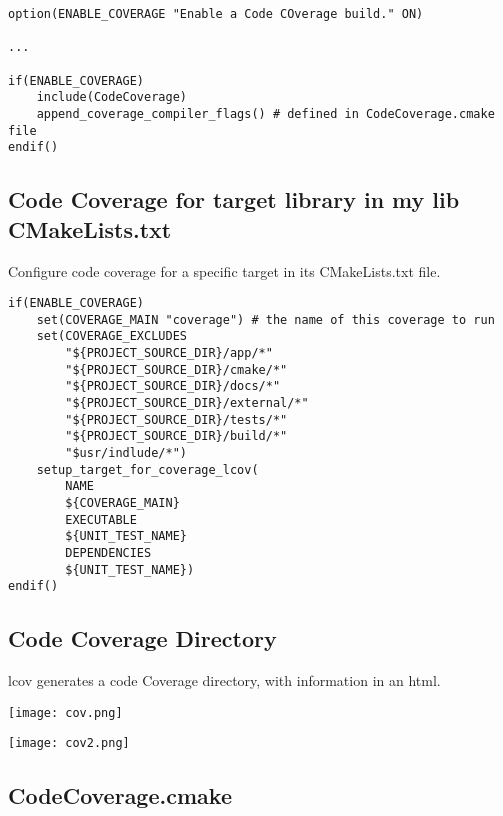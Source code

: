 \documentclass[openany]{report}
\begin{document}
\begin{verbatim}
option(ENABLE_COVERAGE "Enable a Code COverage build." ON)

...

if(ENABLE_COVERAGE)
    include(CodeCoverage)
    append_coverage_compiler_flags() # defined in CodeCoverage.cmake file
endif()

\end{verbatim}

\subsection{Code Coverage for target library in my lib CMakeLists.txt}

Configure code coverage for a specific target in its CMakeLists.txt file.

\begin{verbatim}
if(ENABLE_COVERAGE)
    set(COVERAGE_MAIN "coverage") # the name of this coverage to run
    set(COVERAGE_EXCLUDES
        "${PROJECT_SOURCE_DIR}/app/*"
        "${PROJECT_SOURCE_DIR}/cmake/*"
        "${PROJECT_SOURCE_DIR}/docs/*"
        "${PROJECT_SOURCE_DIR}/external/*"
        "${PROJECT_SOURCE_DIR}/tests/*"
        "${PROJECT_SOURCE_DIR}/build/*"
        "$usr/indlude/*")
    setup_target_for_coverage_lcov(
        NAME
        ${COVERAGE_MAIN}
        EXECUTABLE
        ${UNIT_TEST_NAME}
        DEPENDENCIES
        ${UNIT_TEST_NAME})
endif()
\end{verbatim}


\subsection{Code Coverage Directory}

lcov generates a code Coverage directory, with information in an html.


\begin{center}
    \texttt{[image: cov.png]}
\end{center}


\begin{center}
    \texttt{[image: cov2.png]}
\end{center}



\subsection{CodeCoverage.cmake}
\end{document}
